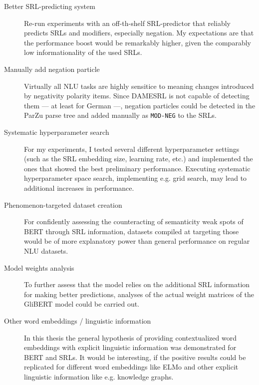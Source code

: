 \begin{description}
  \item[Better SRL-predicting system] Re-run experiments with an off-th-shelf SRL-predictor that reliably
    predicts SRLs and modifiers, especially negation. My expectations are that the performance boost would
    be remarkably higher, given the comparably low informationality of the used SRLs.
  \item[Manually add negation particle] Virtually all NLU tasks are highly sensitice to
    meaning changes introduced by negativity polarity items. Since DAMESRL is not capable
    of detecting them --- at least for German ---, negation particles could be detected in the ParZu parse tree and
    added manually as \texttt{MOD-NEG} to the SRLs.
  \item[Systematic hyperparameter search] For my experiments, I tested several different hyperparameter
    settings (such as the SRL embedding size, learning rate, etc.) and implemented the ones that
    showed the best preliminary performance. Executing systematic hyperparameter space search, implementing e.g. grid search, may
    lead to additional increases in performance.
  \item[Phenomenon-targeted dataset creation] For confidently assessing the counteracting of semanticity
    weak spots of BERT through SRL information, datasets compiled at targeting those would be of more
    explanatory power than general performance on regular NLU datasets.
  \item[Model weights analysis] To further assess that the model relies on the additional SRL information for
    making better predictions, analyses of the actual weight matrices of the GliBERT model could be carried out.
  \item[Other word embeddings / linguistic information] In this thesis the general hypothesis of providing
    contextualized word embeddings with explicit linguistic information was demonstrated for BERT and SRLs.
    It would be interesting, if the positive results could be replicated for different word embeddings like
    ELMo and other explicit linguistic information like e.g. knowledge graphs.
\end{description}

